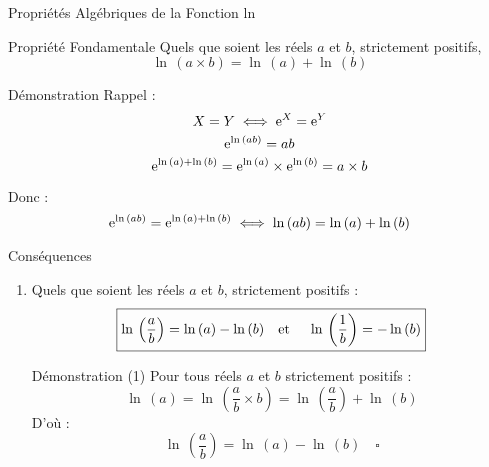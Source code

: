 \documentclass{cours}
\begin{document}
    \pagebreak
    \begin{Gpartie}{Propriétés Algébriques de la Fonction ln}
        \begin{Spartie}{Propriété Fondamentale}
            Quels que soient les réels $a$ et $b$, strictement positifs, 
            \[\boxed{\ln\,(a\times b)=\ln\,(a)+\ln\,(b)}\]
            \begin{SSpartie}{Démonstration}
                Rappel : \[X=Y\iff \mathrm{e}^X=\mathrm{e}^Y\]
                \[\mathrm{e}^{\ln\,(ab)}=ab\]
                \[\mathrm{e}^{\ln\,(a)+\ln\,(b)}=\mathrm{e}^{\ln\,(a)}\times \mathrm{e}^{\ln\,(b)}=a\times b\]

                Donc : \[\mathrm{e}^{\ln\,(ab)}=\mathrm{e}^{\ln\,(a)+\ln\,(b)}\iff\ln\,(ab)=\ln\,(a)+\ln\,(b)\]
            \end{SSpartie}
        \end{Spartie}
        \begin{Spartie}{Conséquences}
            \begin{enumerate}[(1)]
                \item Quels que soient les réels $a$ et $b$, strictement positifs :
                \[\boxed{\ln\,\left(\frac{a}{b}\right)=\ln\,(a)-\ln\,(b)\text{\quad et \quad}\ln\,\left(\frac{1}{b}\right)=-\ln\,(b)}\]
                \begin{SSpartie}{Démonstration (1)} 
                    Pour tous réels $a$ et $b$ strictement positifs : \[\ln\,(a)=\ln\,\left(\frac{a}{b}\times b\right)=\ln\,\left(\frac{a}{b}\right)+\ln\,(b)\]
                    D'où : \[\ln\,\left(\frac{a}{b}\right)=\ln\,(a)-\ln\,(b)\quad\square\]


\end{SSpartie}
\end{enumerate}
\end{Spartie}
\end{Gpartie}
\end{document}
